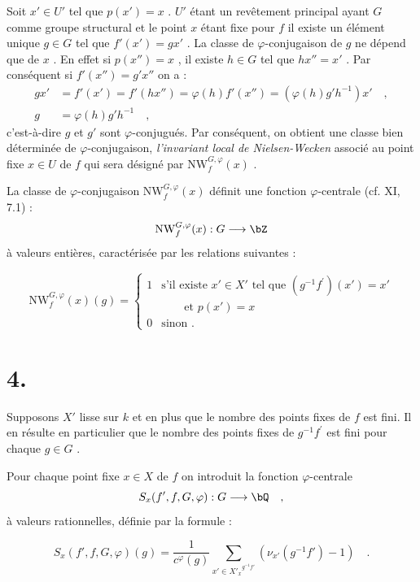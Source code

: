 Soit $x' \in U'$ tel que $p(x') = x$ . $U'$ étant un revêtement principal ayant $G$ comme groupe structural et le point $x$ étant fixe pour $f$ il existe un élément unique $g \in G$ tel que $f'(x') = gx'$ . La classe de $\varphi$-conjugaison de $g$ ne dépend que de $x$ . En effet si $p(x'') = x$ , il existe $h \in G$ tel que $hx'' = x'$ . Par conséquent si $f'(x'') = g'x''$ on a :
\begin{align*}
gx' &= f'(x') = f'(hx'') = \varphi(h)f'(x'') = (\varphi(h)g'h^{-1})x' \quad , \\
g &= \varphi(h)g'h^{-1} \quad ,
\end{align*}
c'est-à-dire $g$ et $g'$ sont $\varphi$-conjugués. Par conséquent, on obtient une classe bien déterminée de $\varphi$-conjugaison, \emph{l'invariant local de Nielsen-Wecken} associé au point fixe $x \in U$ de $f$ qui sera désigné par $\mathrm{NW}_{f}^{G,\varphi}(x)$ .

La classe de $\varphi$-conjugaison $\mathrm{NW}_{f}^{G,\varphi}(x)$ définit une fonction $\varphi$-centrale (cf. XI, 7.1) :
\[
\mathrm{NW}_{f}^{G,\varphi}(x) : G \longrightarrow \bZ
\]
à valeurs entières, caractérisée par les relations suivantes :

\begin{equation}\tag{3.1}
\mathrm{NW}_{f}^{G,\varphi}(x)(g) = \begin{cases} 1 &
\text{s'il existe } x' \in X' \text{ tel que } (g^{-1}f^{\prime})(x') = x' \\ & \qquad \text{et } p(x') = x \\ 0 & \text{sinon .} \end{cases}
\end{equation}

\section*{4.}

Supposons $X'$ lisse sur $k$ et en plus que le nombre des points fixes de $f$ est fini. Il en résulte en particulier que le nombre des points fixes de $g^{-1}f^{\prime}$ est fini pour chaque $g \in G$ .

Pour chaque point fixe $x \in X$ de $f$ on introduit la fonction $\varphi$-centrale
\[
S_x(f',f,G,\varphi) : G \longrightarrow \bQ \quad ,
\]
à valeurs rationnelles, définie par la formule :

\begin{equation}\tag{4.1}
S_x(f',f,G,\varphi)(g) = \frac{1}{c^\varphi(g)} \sum_{x' \in {X'_x}^{g^{-1}f'}} (\nu_{x'}(g^{-1}f') - 1) \quad .
\end{equation}

